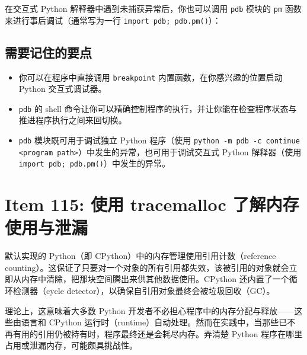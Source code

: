 在交互式 Python 解释器中遇到未捕获异常后，你也可以调用 \texttt{pdb} 模块的 \texttt{pm} 函数来进行事后调试（通常写为一行 \texttt{import pdb; pdb.pm()}）：


\subsection{需要记住的要点}

\begin{itemize}
\item 你可以在程序中直接调用 \texttt{breakpoint} 内置函数，在你感兴趣的位置启动 Python 交互式调试器。
\item \texttt{pdb} 的 shell 命令让你可以精确控制程序的执行，并让你能在检查程序状态与推进程序执行之间来回切换。
\item \texttt{pdb} 模块既可用于调试独立 Python 程序（使用 \texttt{python -m pdb -c continue <program path>}）中发生的异常，也可用于调试交互式 Python 解释器（使用 \texttt{import pdb; pdb.pm()}）中发生的异常。
\end{itemize}

\section{Item 115: 使用 tracemalloc 了解内存使用与泄漏}

默认实现的 Python（即 CPython）中的内存管理使用引用计数（reference counting）。这保证了只要对一个对象的所有引用都失效，该被引用的对象就会立即从内存中清除，把那块空间腾出来供其他数据使用。CPython 还内置了一个循环检测器（cycle detector），以确保自引用对象最终会被垃圾回收（GC）。

理论上，这意味着大多数 Python 开发者不必担心程序中的内存分配与释放——这些由语言和 CPython 运行时（runtime）自动处理。然而在实践中，当那些已不再有用的引用仍被持有时，程序最终还是会耗尽内存。弄清楚 Python 程序在哪里占用或泄漏内存，可能颇具挑战性。

